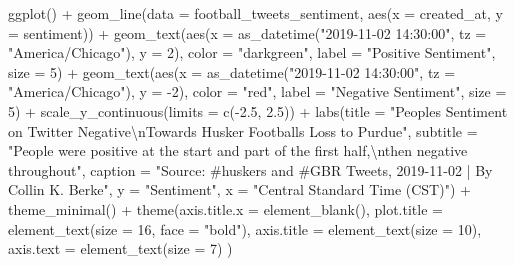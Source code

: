 \documentclass[
]{book}
\newenvironment{Shaded}{\begin{snugshade}}{\end{snugshade}}
\newcommand{\AttributeTok}[1]{\textcolor[rgb]{0.77,0.63,0.00}{#1}}
\newcommand{\DecValTok}[1]{\textcolor[rgb]{0.00,0.00,0.81}{#1}}
\newcommand{\FloatTok}[1]{\textcolor[rgb]{0.00,0.00,0.81}{#1}}
\newcommand{\FunctionTok}[1]{\textcolor[rgb]{0.00,0.00,0.00}{#1}}
\newcommand{\NormalTok}[1]{#1}
\newcommand{\SpecialCharTok}[1]{\textcolor[rgb]{0.00,0.00,0.00}{#1}}
\newcommand{\StringTok}[1]{\textcolor[rgb]{0.31,0.60,0.02}{#1}}
\begin{document}
\begin{Shaded}
\begin{Highlighting}[]
\FunctionTok{ggplot}\NormalTok{() }\SpecialCharTok{+}
  \FunctionTok{geom\_line}\NormalTok{(}\AttributeTok{data =}\NormalTok{ football\_tweets\_sentiment, }\FunctionTok{aes}\NormalTok{(}\AttributeTok{x =}\NormalTok{ created\_at, }\AttributeTok{y =}\NormalTok{ sentiment)) }\SpecialCharTok{+}
  \FunctionTok{geom\_text}\NormalTok{(}\FunctionTok{aes}\NormalTok{(}\AttributeTok{x =} \FunctionTok{as\_datetime}\NormalTok{(}\StringTok{"2019{-}11{-}02 14:30:00"}\NormalTok{, }\AttributeTok{tz =} \StringTok{"America/Chicago"}\NormalTok{), }\AttributeTok{y =} \DecValTok{2}\NormalTok{), }\AttributeTok{color =} \StringTok{"darkgreen"}\NormalTok{, }\AttributeTok{label =} \StringTok{"Positive Sentiment"}\NormalTok{, }\AttributeTok{size =} \DecValTok{5}\NormalTok{) }\SpecialCharTok{+}
  \FunctionTok{geom\_text}\NormalTok{(}\FunctionTok{aes}\NormalTok{(}\AttributeTok{x =} \FunctionTok{as\_datetime}\NormalTok{(}\StringTok{"2019{-}11{-}02 14:30:00"}\NormalTok{, }\AttributeTok{tz =} \StringTok{"America/Chicago"}\NormalTok{), }\AttributeTok{y =} \SpecialCharTok{{-}}\DecValTok{2}\NormalTok{), }\AttributeTok{color =} \StringTok{"red"}\NormalTok{, }\AttributeTok{label =} \StringTok{"Negative Sentiment"}\NormalTok{, }\AttributeTok{size =} \DecValTok{5}\NormalTok{) }\SpecialCharTok{+}
  \FunctionTok{scale\_y\_continuous}\NormalTok{(}\AttributeTok{limits =} \FunctionTok{c}\NormalTok{(}\SpecialCharTok{{-}}\FloatTok{2.5}\NormalTok{, }\FloatTok{2.5}\NormalTok{)) }\SpecialCharTok{+}
  \FunctionTok{labs}\NormalTok{(}\AttributeTok{title =} \StringTok{"People\textquotesingle{}s Sentiment on Twitter Negative}\SpecialCharTok{\textbackslash{}n}\StringTok{Towards Husker Football\textquotesingle{}s Loss to Purdue"}\NormalTok{,}
       \AttributeTok{subtitle =} \StringTok{"People were positive at the start and part of the first half,}\SpecialCharTok{\textbackslash{}n}\StringTok{then negative throughout"}\NormalTok{,}
       \AttributeTok{caption =} \StringTok{"Source: \#huskers and \#GBR Tweets, 2019{-}11{-}02 | By Collin K. Berke"}\NormalTok{,}
       \AttributeTok{y =} \StringTok{"Sentiment"}\NormalTok{,}
       \AttributeTok{x =} \StringTok{"Central Standard Time (CST)"}\NormalTok{) }\SpecialCharTok{+} 
  \FunctionTok{theme\_minimal}\NormalTok{() }\SpecialCharTok{+}
  \FunctionTok{theme}\NormalTok{(}\AttributeTok{axis.title.x =} \FunctionTok{element\_blank}\NormalTok{(),}
        \AttributeTok{plot.title =} \FunctionTok{element\_text}\NormalTok{(}\AttributeTok{size =} \DecValTok{16}\NormalTok{, }\AttributeTok{face =} \StringTok{"bold"}\NormalTok{),}
    \AttributeTok{axis.title =} \FunctionTok{element\_text}\NormalTok{(}\AttributeTok{size =} \DecValTok{10}\NormalTok{),}
    \AttributeTok{axis.text =} \FunctionTok{element\_text}\NormalTok{(}\AttributeTok{size =} \DecValTok{7}\NormalTok{)}
\NormalTok{  )}
\end{Highlighting}
\end{Shaded}
\end{document}
